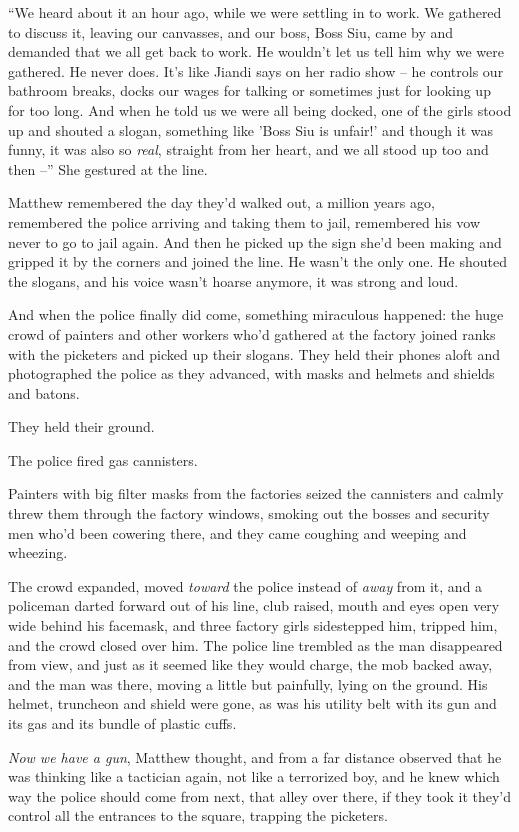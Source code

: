 ``We heard about it an hour ago, while we were settling in to work.
We gathered to discuss it, leaving our canvasses, and our boss,
Boss Siu, came by and demanded that we all get back to work. He
wouldn't let us tell him why we were gathered. He never does. It's
like Jiandi says on her radio show -- he controls our bathroom
breaks, docks our wages for talking or sometimes just for looking
up for too long. And when he told us we were all being docked, one
of the girls stood up and shouted a slogan, something like 'Boss
Siu is unfair!' and though it was funny, it was also so
\emph{real}, straight from her heart, and we all stood up too and
then --'' She gestured at the line.

Matthew remembered the day they'd walked out, a million years ago,
remembered the police arriving and taking them to jail, remembered
his vow never to go to jail again. And then he picked up the sign
she'd been making and gripped it by the corners and joined the
line. He wasn't the only one. He shouted the slogans, and his voice
wasn't hoarse anymore, it was strong and loud.

And when the police finally did come, something miraculous
happened: the huge crowd of painters and other workers who'd
gathered at the factory joined ranks with the picketers and picked
up their slogans. They held their phones aloft and photographed the
police as they advanced, with masks and helmets and shields and
batons.

They held their ground.

The police fired gas cannisters.

Painters with big filter masks from the factories seized the
cannisters and calmly threw them through the factory windows,
smoking out the bosses and security men who'd been cowering there,
and they came coughing and weeping and wheezing.

The crowd expanded, moved \emph{toward} the police instead of
\emph{away} from it, and a policeman darted forward out of his
line, club raised, mouth and eyes open very wide behind his
facemask, and three factory girls sidestepped him, tripped him, and
the crowd closed over him. The police line trembled as the man
disappeared from view, and just as it seemed like they would
charge, the mob backed away, and the man was there, moving a little
but painfully, lying on the ground. His helmet, truncheon and
shield were gone, as was his utility belt with its gun and its gas
and its bundle of plastic cuffs.

\emph{Now we have a gun}, Matthew thought, and from a far distance
observed that he was thinking like a tactician again, not like a
terrorized boy, and he knew which way the police should come from
next, that alley over there, if they took it they'd control all the
entrances to the square, trapping the picketers.

